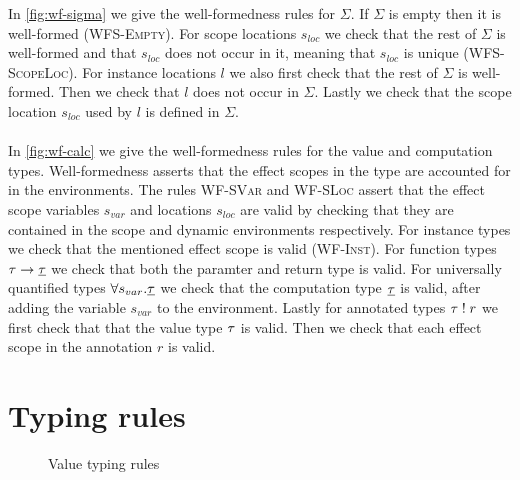 {In \cref{fig:wf-sigma} we give the well-formedness rules for $\Sigma$.
If $\Sigma$ is empty then it is well-formed (\textsc{WFS-Empty}).
For scope locations $s_{loc}$ we check that the rest of $\Sigma$ is well-formed and that $s_{loc}$ does not occur in it, meaning that $s_{loc}$ is unique (\textsc{WFS-ScopeLoc}).
For instance locations $l$ we also first check that the rest of $\Sigma$ is well-formed.
Then we check that $l$ does not occur in $\Sigma$.
Lastly we check that the scope location $s_{loc}$ used by $l$ is defined in $\Sigma$.
\\\\
In \cref{fig:wf-calc} we give the well-formedness rules for the value and computation types.
Well-formedness asserts that the effect scopes in the type are accounted for in the environments.
The rules \textsc{WF-SVar} and \textsc{WF-SLoc} assert that the effect scope variables $s_{var}$ and locations $s_{loc}$ are valid by checking that they are contained in the scope and dynamic environments respectively.
For instance types we check that the mentioned effect scope is valid (\textsc{WF-Inst}).
For function types $\tau \rightarrow \underline{\tau}$ we check that both the paramter and return type is valid.
For universally quantified types $\forall s_{var} . \underline{\tau}$ we check that the computation type $\underline{\tau}$ is valid, after adding the variable $s_{var}$ to the environment.
Lastly for annotated types $\tau \; ! \; r$ we first check that that the value type $\tau$ is valid.
Then we check that each effect scope in the annotation $r$ is valid.

\section{Typing rules}
\label{sec:typingrules}

\begin{figure}[h]
\caption{Value typing rules}
\centering
{}
\end{figure}

}
